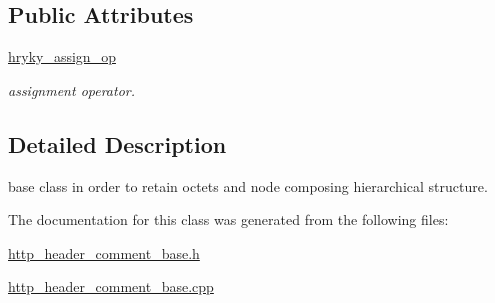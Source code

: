 \subsection*{Public Attributes}
\begin{DoxyCompactItemize}
\item 
\hypertarget{classhryky_1_1http_1_1header_1_1comment_1_1_base_addad64894098bb6bef0fea432ffe5e2f}{\hyperlink{classhryky_1_1http_1_1header_1_1comment_1_1_base_addad64894098bb6bef0fea432ffe5e2f}{hryky\-\_\-assign\-\_\-op}}\label{classhryky_1_1http_1_1header_1_1comment_1_1_base_addad64894098bb6bef0fea432ffe5e2f}

\begin{DoxyCompactList}\small\item\em assignment operator. \end{DoxyCompactList}\end{DoxyCompactItemize}


\subsection{Detailed Description}
base class in order to retain octets and node composing hierarchical structure. 

The documentation for this class was generated from the following files\-:\begin{DoxyCompactItemize}
\item 
\hyperlink{http__header__comment__base_8h}{http\-\_\-header\-\_\-comment\-\_\-base.\-h}\item 
\hyperlink{http__header__comment__base_8cpp}{http\-\_\-header\-\_\-comment\-\_\-base.\-cpp}\end{DoxyCompactItemize}
